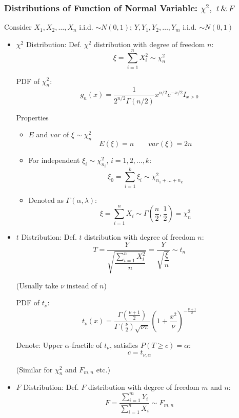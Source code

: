     \subsubsection{Distributions of Function of Normal Variable: $\chi^2,$ $t\,\& \,F$}\label{chi2_t_F_properties}
        Consider $X_1,X_2,\ldots,X_n$ i.i.d. $\sim N(0,1)$; $Y,Y_1,Y_2,\ldots,Y_m$ i.i.d. $\sim N(0,1)$
        \begin{itemize}
            \item $\chi^2$ Distribution: Def. $\chi^2$ distribution with degree of freedom $n$:
            \[
                \xi =\sum_{i=1}^n X_i^2\sim \chi^2_n
            \]

            PDF of $\chi^2_n$:
            \[
                g_n(x)=\dfrac{1}{2^{n/2}\Gamma(n/2)}x^{n/2}e^{-x/2}I_{x>0}  
            \]

            Properties
            \begin{itemize}
                \item $E$ and $var$ of $\xi\sim\chi^2_n$
                \[E(\xi)=n\qquad var(\xi)=2n\]
                \item For independent $\xi_i\sim\chi^2_{n_i},\, i=1,2,\ldots,k$:\[
                    \xi_0=\sum_{i=1}^k\xi_i\sim\chi^2_{n_1+\ldots+n_k}\]
                \item Denoted as $\Gamma(\alpha,\lambda)$: \[\xi=\sum_{i=1}^nX_i\sim\Gamma(\frac{n}{2},\frac{1}{2})=\chi^2_n\]
            \end{itemize}
            \item $t$ Distribution: Def. $t$ distribution with degree of freedom $n$:
            \[
                T=\frac{Y}{\sqrt{\dfrac{\sum_{i=1}^nX_i^2}{n}}}=\frac{Y}{\sqrt{\dfrac{\xi}{n}}}\sim t_n
            \]

            (Usually take $\nu$ instead of $n$)

            PDF of $t_\nu$:
            \[t_\nu(x)=\dfrac{\Gamma(\frac{\nu+1}{2})}{\Gamma(\frac{\nu}{2})\sqrt{\nu\pi}}\left(1+\frac{x^2}{\nu}\right)^{-\frac{\nu+1}{2}}\]

            Denote: Upper $\alpha$-fractile of $t_\nu$, satisfies $P(T\geq c)=\alpha$:
            \[
                c=t_{\nu,\alpha}
            \]
            
            (Similar for $\chi^2_n$ and $F_{m,n}$ etc.)
            \item $F$ Distribution: Def. $F$ distribution with degree of freedom $m$ and $n$:
            \[
                F=\frac{\sum_{i=1}^mY_i}{\sum_{i=1}^nX_i}\sim F_{m,n}
            \]


\end{itemize}
